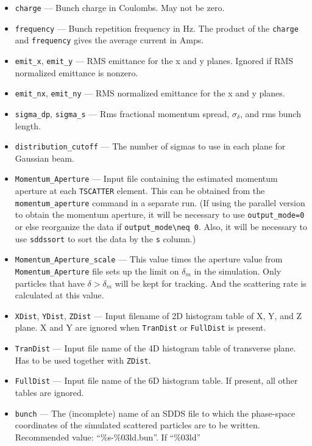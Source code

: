 \documentclass[11pt]{article}
\begin{document}
\begin{itemize}
   \item \verb|charge| --- Bunch charge in Coulombs. May  not be zero.
   \item \verb|frequency| --- Bunch repetition frequency in Hz. The product of the \verb|charge| and \verb|frequency| gives
     the average current in Amps.
   \item \verb|emit_x|, \verb|emit_y| --- RMS emittance for the x and y planes.  Ignored 
   if RMS normalized emittance is nonzero.
   \item \verb|emit_nx|, \verb|emit_ny| --- RMS normalized emittance for the x and y planes.
   \item \verb|sigma_dp|, \verb|sigma_s| --- Rms fractional momentum spread, $\sigma_\delta$, and rms bunch length.
   \item \verb|distribution_cutoff| --- The number of sigmas to use in each plane for Gaussian beam.
   \item \verb|Momentum_Aperture| --- Input file containing the estimated momentum aperture at each
   \verb|TSCATTER| element. This can be obtained from the \verb|momentum_aperture| command in a separate run.
   (If using the parallel version to obtain the momentum aperture, it will be necessary to use \verb|output_mode=0|
   or else reorganize the data if \verb|output_mode\neq 0|. Also, it will be necessary to use \verb|sddssort| to
   sort the data by the \verb|s| column.)
   \item \verb|Momentum_Aperture_scale| --- This value times the aperture value from \verb|Momentum_Aperture|
   file sets up the limit on $\delta_m$ in the simulation. Only particles that have $\delta>\delta_m$ 
   will be kept for tracking. 
   And the scattering rate is calculated at this value.
   \item \verb|XDist|, \verb|YDist|, \verb|ZDist| --- Input filename of 2D histogram table of X, Y, and Z plane. 
   X and Y are ignored when \verb|TranDist| or \verb|FullDist| is present. 
   \item \verb|TranDist| --- Input file name of the 4D histogram table of transverse plane. 
   Has to be used together with \verb|ZDist|.
   \item \verb|FullDist| --- Input file name of the 6D histogram table. If present, all other 
   tables are ignored.
   \item \verb|bunch| --- The (incomplete) name of an SDDS file to which the phase-space coordinates of 
   the simulated scattered particles are to be written. Recommended value: ``\%s-\%03ld.bun''. If ``\%03ld''

\end{itemize}
\end{document}
